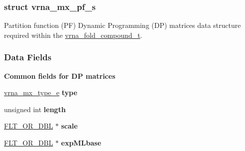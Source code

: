 \label{structvrna__mx__pf__s}
\hypertarget{group__dp__matrices_structvrna__mx__pf__s}{}
\subsubsection{struct vrna\-\_\-mx\-\_\-pf\-\_\-s}
Partition function (P\-F) Dynamic Programming (D\-P) matrices data structure required within the \hyperlink{group__fold__compound_ga1b0cef17fd40466cef5968eaeeff6166}{vrna\-\_\-fold\-\_\-compound\-\_\-t}. \subsubsection*{Data Fields}
\begin{Indent}{\bf Common fields for D\-P matrices}\par
\begin{DoxyCompactItemize}
\item 
\hypertarget{group__dp__matrices_a74ba745d6fc4ac5d437bc24450ea789c}{\hyperlink{group__dp__matrices_ga6042ea1d58d01931e959791be6d89343}{vrna\-\_\-mx\-\_\-type\-\_\-e} {\bfseries type}}\label{group__dp__matrices_a74ba745d6fc4ac5d437bc24450ea789c}

\item 
\hypertarget{group__dp__matrices_a798f72ece3f3f970bb0de2120600ad63}{unsigned int {\bfseries length}}\label{group__dp__matrices_a798f72ece3f3f970bb0de2120600ad63}

\item 
\hypertarget{group__dp__matrices_a133ac57938cb0969da254a594572baf8}{\hyperlink{group__data__structures_ga31125aeace516926bf7f251f759b6126}{F\-L\-T\-\_\-\-O\-R\-\_\-\-D\-B\-L} $\ast$ {\bfseries scale}}\label{group__dp__matrices_a133ac57938cb0969da254a594572baf8}

\item 
\hypertarget{group__dp__matrices_ae18e83833416f62943d5dd7be1cc038f}{\hyperlink{group__data__structures_ga31125aeace516926bf7f251f759b6126}{F\-L\-T\-\_\-\-O\-R\-\_\-\-D\-B\-L} $\ast$ {\bfseries exp\-M\-Lbase}}\label{group__dp__matrices_ae18e83833416f62943d5dd7be1cc038f}

\end{DoxyCompactItemize}
\end{Indent}
